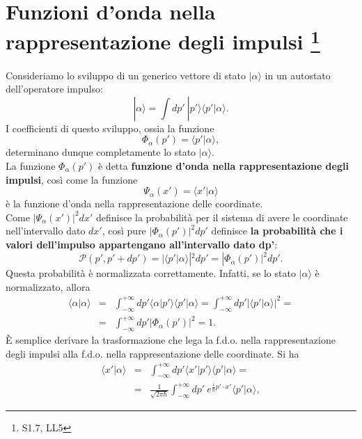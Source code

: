 \section[Funzioni d'onda nella rappresentazione degli impulsi]{Funzioni d'onda nella rappresentazione degli impulsi \footnote{S1.7, LL5}}
Consideriamo lo sviluppo di un generico vettore di stato $| \alpha \rangle$ in un autostato dell'operatore impulso:
\begin{equation}
| \alpha \rangle = \int dp' ~ | p' \rangle \langle p' | \alpha \rangle.
\end{equation}
I coefficienti di questo sviluppo, ossia la funzione
\begin{equation}
\Phi_\alpha (p') =  \langle p' | \alpha \rangle,
\end{equation}
determinano dunque completamente lo stato $| \alpha \rangle$.\\
La funzione $\Phi_\alpha (p')$ è detta \textbf{funzione d'onda nella rappresentazione degli impulsi}, così come la funzione
\begin{equation}
\Psi_\alpha (x') =  \langle x' | \alpha \rangle
\end{equation}
è la funzione d'onda nella rappresentazione delle coordinate.\\
Come $|\Psi_\alpha (x')|^2 dx'$ definisce la probabilità per il sistema di avere le coordinate nell'intervallo dato $dx'$, così pure $|\Phi_\alpha (p')|^2 dp'$ definisce \textbf{la probabilità che i valori dell'impulso appartengano all'intervallo dato dp'}:
\begin{equation}
\mathcal{P}(p', p'+dp') = |\langle p' | \alpha \rangle|^2 dp' = |\Phi_\alpha (p')|^2 dp'.
\end{equation}
Questa probabilità è normalizzata correttamente. Infatti, se lo stato $| \alpha \rangle$ è normalizzato, allora
\begin{eqnarray}
\langle \alpha | \alpha \rangle &=& \int_{-\infty}^{+\infty} dp' \langle \alpha | p' \rangle \langle p' | \alpha \rangle = \int_{-\infty}^{+\infty} dp' | \langle p' | \alpha \rangle |^2 = \nonumber \\
&=& \int_{-\infty}^{+\infty} dp' |\Phi_\alpha (p')|^2 = 1 .
\end{eqnarray}
\`E semplice derivare la trasformazione che lega la f.d.o. nella rappresentazione degli impulsi alla f.d.o. nella rappresentazione delle coordinate. Si ha
\begin{eqnarray}
\langle x' | \alpha \rangle &=& \int_{-\infty}^{+\infty} dp' \langle x' | p' \rangle \langle p' | \alpha \rangle =  \nonumber \\
&=& \frac{1}{\sqrt{2 \pi \hbar}} \int_{-\infty}^{+\infty} dp' ~ e^{\frac{i}{\hbar}p' \cdot x'} \langle p' | \alpha \rangle ,
\end{eqnarray}
